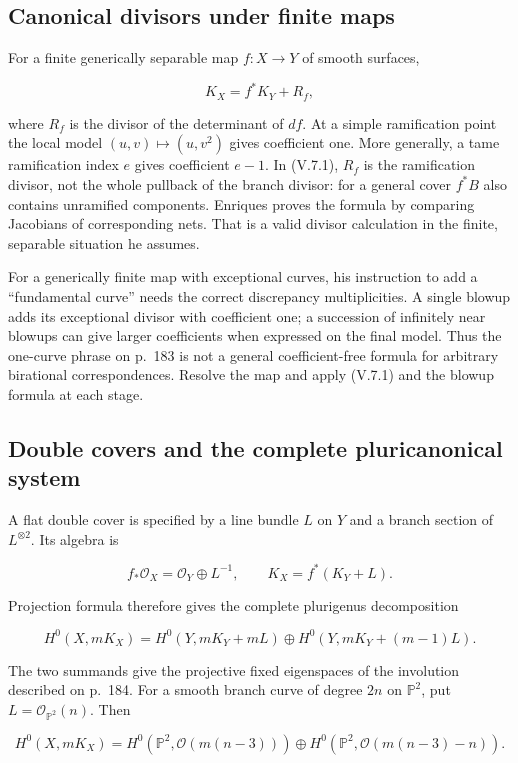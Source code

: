 \subsection{Canonical divisors under finite maps}

For a finite generically separable map \(f:X\to Y\) of smooth surfaces,

\[
K_X=f^*K_Y+R_f, \tag{V.7.1}
\]

where \(R_f\) is the divisor of the determinant of \(df\). At a simple ramification point the local model \((u,v)\mapsto(u,v^2)\) gives coefficient one. More generally, a tame ramification index \(e\) gives coefficient \(e-1\). In (V.7.1), \(R_f\) is the ramification divisor, not the whole pullback of the branch divisor: for a general cover \(f^*B\) also contains unramified components. Enriques proves the formula by comparing Jacobians of corresponding nets. That is a valid divisor calculation in the finite, separable situation he assumes.

For a generically finite map with exceptional curves, his instruction to add a ``fundamental curve'' needs the correct discrepancy multiplicities. A single blowup adds its exceptional divisor with coefficient one; a succession of infinitely near blowups can give larger coefficients when expressed on the final model. Thus the one-curve phrase on p.~183 is not a general coefficient-free formula for arbitrary birational correspondences. Resolve the map and apply (V.7.1) and the blowup formula at each stage.

\subsection{Double covers and the complete pluricanonical system}

A flat double cover is specified by a line bundle \(L\) on \(Y\) and a branch section of \(L^{\otimes2}\). Its algebra is

\[
f_*\mathcal O_X=\mathcal O_Y\oplus L^{-1},\qquad
K_X=f^*(K_Y+L).
\]

Projection formula therefore gives the complete plurigenus decomposition

\[
H^0(X,mK_X)=
H^0(Y,mK_Y+mL)\oplus H^0(Y,mK_Y+(m-1)L). \tag{V.7.2}
\]

The two summands give the projective fixed eigenspaces of the involution described on p.~184. For a smooth branch curve of degree \(2n\) on \(\mathbb P^2\), put \(L=\mathcal O_{\mathbb P^2}(n)\). Then

\[
H^0(X,mK_X)=H^0(\mathbb P^2,\mathcal O(m(n-3)))
\oplus H^0(\mathbb P^2,\mathcal O(m(n-3)-n)).
\]

